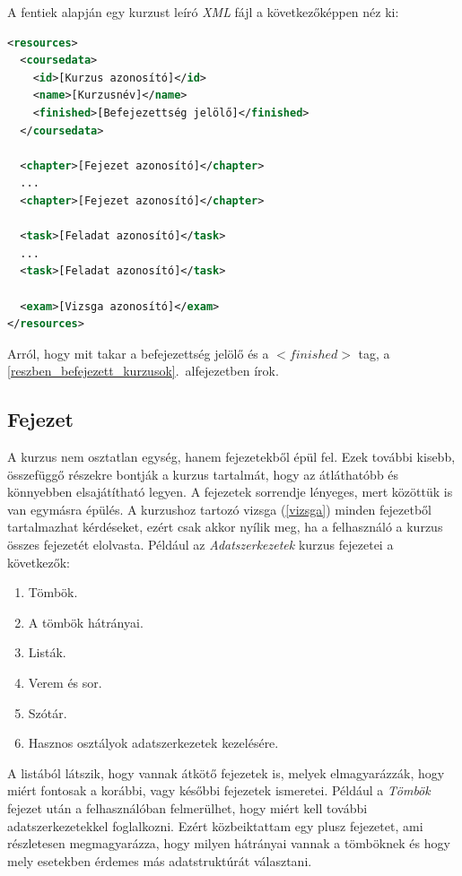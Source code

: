 \documentclass[12pt,a4paper]{article}
\newcommand{\xml}{\textit{XML}\xspace}
\begin{document}
	A fentiek alapján egy kurzust leíró \xml fájl a következőképpen néz ki:
	
	\bigskip
	\begin{lstlisting}[language=XML]
<resources>
  <coursedata>
    <id>[Kurzus azonosító]</id>
    <name>[Kurzusnév]</name>
    <finished>[Befejezettség jelölő]</finished>
  </coursedata>
  
  <chapter>[Fejezet azonosító]</chapter>
  ...
  <chapter>[Fejezet azonosító]</chapter>
  
  <task>[Feladat azonosító]</task>
  ...
  <task>[Feladat azonosító]</task>
  
  <exam>[Vizsga azonosító]</exam>
</resources>
	\end{lstlisting}
	\bigskip
	
	Arról, hogy mit takar a befejezettség jelölő és a $<finished>$ tag, a \ref{reszben_befejezett_kurzusok}.\ alfejezetben írok.
	
	\subsection{Fejezet}\label{fejezet}
	
	A kurzus nem osztatlan egység, hanem fejezetekből épül fel. Ezek további kisebb, összefüggő részekre bontják a kurzus tartalmát, hogy az átláthatóbb és könnyebben elsajátítható legyen. A fejezetek sorrendje lényeges, mert közöttük is van egymásra épülés. A kurzushoz tartozó vizsga (\ref{vizsga}) minden fejezetből tartalmazhat kérdéseket, ezért csak akkor nyílik meg, ha a felhasználó a kurzus összes fejezetét elolvasta. Például az \textit{Adatszerkezetek} kurzus fejezetei a következők:
	
	\begin{enumerate}
		\item Tömbök.
		\item A tömbök hátrányai.
		\item Listák.
		\item Verem és sor.
		\item Szótár.
		\item Hasznos osztályok adatszerkezetek kezelésére.
	\end{enumerate}  

	A listából látszik, hogy vannak átkötő fejezetek is, melyek elmagyarázzák, hogy miért fontosak a korábbi, vagy későbbi fejezetek ismeretei. Például a \textit{Tömbök} fejezet után a felhasználóban felmerülhet, hogy miért kell további adatszerkezetekkel foglalkozni. Ezért közbeiktattam egy plusz fejezetet, ami részletesen megmagyarázza, hogy milyen hátrányai vannak a tömböknek és hogy mely esetekben érdemes más adatstruktúrát választani.
	
\end{document}
